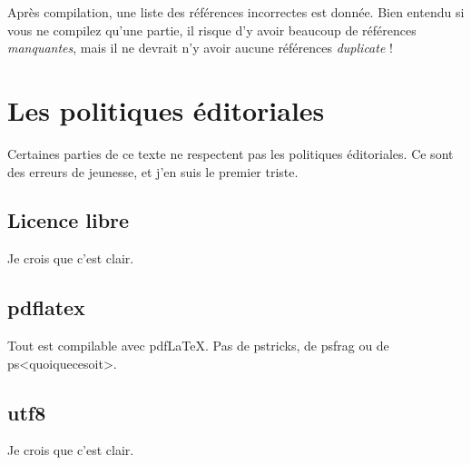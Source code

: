 \documentclass[a4paper,12pt]{article}
\begin{document}
Après compilation, une liste des références incorrectes est donnée. Bien entendu si vous ne compilez qu'une partie, il risque d'y avoir beaucoup de références \emph{manquantes}, mais il ne devrait n'y avoir aucune références \emph{duplicate} !


\section{Les politiques éditoriales}

Certaines parties de ce texte ne respectent pas les politiques éditoriales. Ce sont des erreurs de jeunesse, et j'en suis le premier triste.

\subsection{Licence libre}

Je crois que c'est clair.

\subsection{pdflatex}

Tout est compilable avec pdf\LaTeX. Pas de pstricks, de psfrag ou de ps<quoiquecesoit>.

\subsection{utf8}

Je crois que c'est clair.
\end{document}
